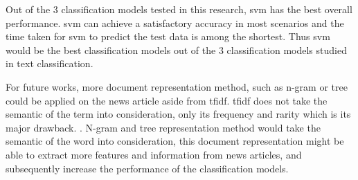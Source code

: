 Out of the 3 classification models tested in this research, \ac{svm} has the best overall performance. \Ac{svm} can achieve a satisfactory accuracy in most scenarios and the time taken for \ac{svm} to predict the test data is among the shortest. Thus \ac{svm} would be the best classification models out of the 3 classification models studied in text classification.

For future works, more document representation method, such as n-gram or tree could be applied on the news article aside from \ac{tfidf}. \Ac{tfidf} does not take the semantic of the term into consideration, only its frequency and rarity which is its major drawback. \cite{tfidfDrawback}. N-gram and tree representation method would take the semantic of the word into consideration, this document representation might be able to extract more features and information from news articles, and subsequently increase the performance of the classification models.\\
